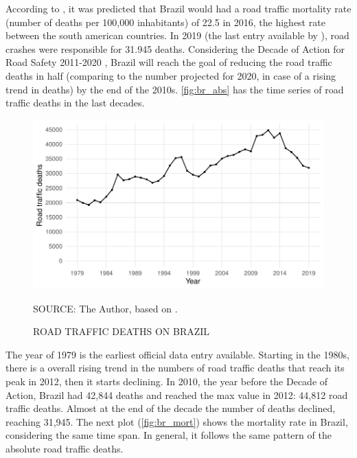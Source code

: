 

 According to \textcite{WHO2018}, it was predicted that Brazil would had a road traffic mortality rate (number of deaths per 100,000 inhabitants) of 22.5 in 2016, the highest rate between the south american countries. In 2019 (the last entry available by \textcite{MinistryofHealth2020}), road crashes were responsible for 31.945 deaths. Considering the Decade of Action for Road Safety 2011-2020 \cite{WHO2011}, Brazil will reach the goal of reducing the road traffic deaths in half (comparing to the number projected for 2020, in case of a rising trend in deaths) by the end of the 2010s. \autoref{fig:br_abs} has the time series of road traffic deaths in the last decades.  


\begin{figure}[!htbp]
    \centering\footnotesize
    \captionsetup{font=footnotesize}
    \caption{ROAD TRAFFIC DEATHS ON BRAZIL}
    \includegraphics{fig/brazil_abs.pdf}
    \label{fig:br_abs}
    \par SOURCE: The Author, based on \textcite{MinistryofHealth2020}.
\end{figure}


The year of 1979 is the earliest official data entry available. Starting in the 1980s, there is a overall rising trend in the numbers of road traffic deaths that reach its peak in 2012, then it starts declining. In 2010, the year before the Decade of Action, Brazil had 42,844 deaths and reached the max value in 2012: 44,812 road traffic deaths. Almost at the end of the decade the number of deaths declined, reaching 31,945. The next plot (\autoref{fig:br_mort}) shows the mortality rate in Brazil, considering the same time span. In general, it follows the same pattern of the absolute road traffic deaths.

